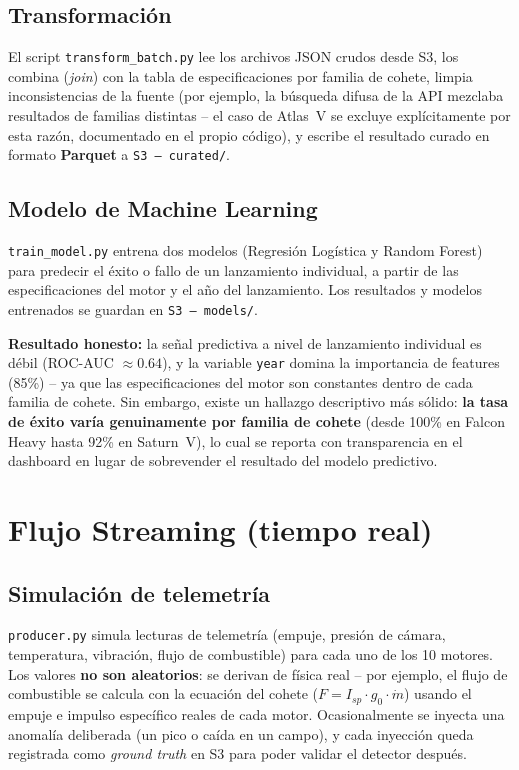 \documentclass[11pt]{article}
\begin{document}
\subsection{Transformación}
El script \texttt{transform\_batch.py} lee los archivos JSON crudos desde S3, los combina (\textit{join}) con la tabla de especificaciones por familia de cohete, limpia inconsistencias de la fuente (por ejemplo, la búsqueda difusa de la API mezclaba resultados de familias distintas -- el caso de Atlas~V se excluye explícitamente por esta razón, documentado en el propio código), y escribe el resultado curado en formato \textbf{Parquet} a \texttt{S3 -- curated/}.

\subsection{Modelo de Machine Learning}
\texttt{train\_model.py} entrena dos modelos (Regresión Logística y Random Forest) para predecir el éxito o fallo de un lanzamiento individual, a partir de las especificaciones del motor y el año del lanzamiento. Los resultados y modelos entrenados se guardan en \texttt{S3 -- models/}.

\textbf{Resultado honesto:} la señal predictiva a nivel de lanzamiento individual es débil (ROC-AUC $\approx 0.64$), y la variable \texttt{year} domina la importancia de features (85\%) -- ya que las especificaciones del motor son constantes dentro de cada familia de cohete. Sin embargo, existe un hallazgo descriptivo más sólido: \textbf{la tasa de éxito varía genuinamente por familia de cohete} (desde 100\% en Falcon Heavy hasta 92\% en Saturn~V), lo cual se reporta con transparencia en el dashboard en lugar de sobrevender el resultado del modelo predictivo.

\newpage
\section{Flujo Streaming (tiempo real)}

\subsection{Simulación de telemetría}
\texttt{producer.py} simula lecturas de telemetría (empuje, presión de cámara, temperatura, vibración, flujo de combustible) para cada uno de los 10 motores. Los valores \textbf{no son aleatorios}: se derivan de física real -- por ejemplo, el flujo de combustible se calcula con la ecuación del cohete ($F = I_{sp} \cdot g_0 \cdot \dot{m}$) usando el empuje e impulso específico reales de cada motor. Ocasionalmente se inyecta una anomalía deliberada (un pico o caída en un campo), y cada inyección queda registrada como \textit{ground truth} en S3 para poder validar el detector después.
\end{document}
